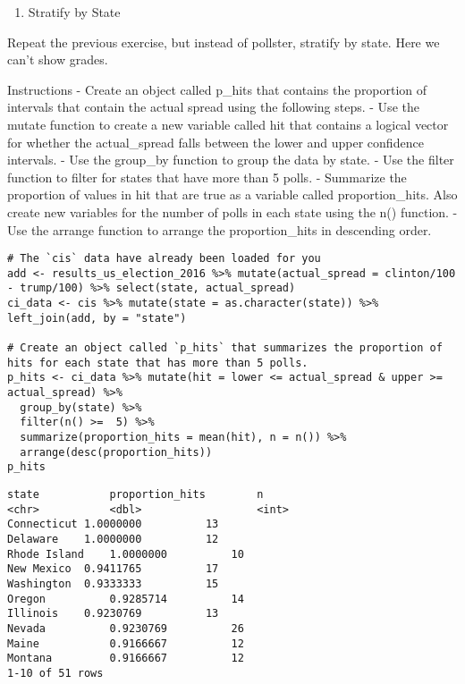 \documentclass[
]{article}
\providecommand{\tightlist}{%
  \setlength{\itemsep}{0pt}\setlength{\parskip}{0pt}}
\begin{document}
\begin{enumerate}
\def\labelenumi{\arabic{enumi}.}
\setcounter{enumi}{3}
\tightlist
\item
  Stratify by State
\end{enumerate}

Repeat the previous exercise, but instead of pollster, stratify by
state. Here we can't show grades.

Instructions - Create an object called p\_hits that contains the
proportion of intervals that contain the actual spread using the
following steps. - Use the mutate function to create a new variable
called hit that contains a logical vector for whether the actual\_spread
falls between the lower and upper confidence intervals. - Use the
group\_by function to group the data by state. - Use the filter function
to filter for states that have more than 5 polls. - Summarize the
proportion of values in hit that are true as a variable called
proportion\_hits. Also create new variables for the number of polls in
each state using the n() function. - Use the arrange function to arrange
the proportion\_hits in descending order.

\begin{verbatim}
# The `cis` data have already been loaded for you
add <- results_us_election_2016 %>% mutate(actual_spread = clinton/100 - trump/100) %>% select(state, actual_spread)
ci_data <- cis %>% mutate(state = as.character(state)) %>% left_join(add, by = "state")

# Create an object called `p_hits` that summarizes the proportion of hits for each state that has more than 5 polls. 
p_hits <- ci_data %>% mutate(hit = lower <= actual_spread & upper >= actual_spread) %>% 
  group_by(state) %>%
  filter(n() >=  5) %>%
  summarize(proportion_hits = mean(hit), n = n()) %>%
  arrange(desc(proportion_hits)) 
p_hits
\end{verbatim}

\begin{verbatim}
state           proportion_hits        n
<chr>           <dbl>                  <int>
Connecticut 1.0000000          13
Delaware    1.0000000          12
Rhode Island    1.0000000          10
New Mexico  0.9411765          17
Washington  0.9333333          15
Oregon          0.9285714          14
Illinois    0.9230769          13
Nevada          0.9230769          26
Maine           0.9166667          12
Montana         0.9166667          12
1-10 of 51 rows
\end{verbatim}
\end{document}
